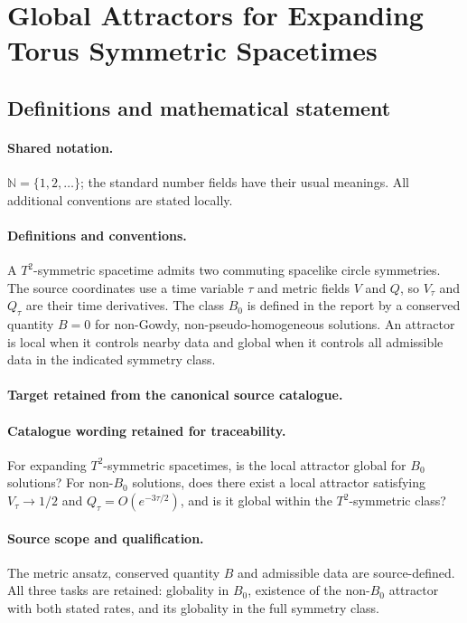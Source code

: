 \documentclass[11pt]{article}
\begin{document}
\section{Global Attractors for Expanding Torus Symmetric Spacetimes}\label{statement}

\subsection{Definitions and mathematical statement}

\paragraph{Shared notation.}$\mathbb N=\{1,2,\ldots\}$; the standard number fields have their usual meanings. All additional conventions are stated locally.


\paragraph{Definitions and conventions.}
A $T^2$-symmetric spacetime admits two commuting spacelike circle symmetries. The source coordinates use a time variable $\tau$ and metric fields $V$ and $Q$, so $V_\tau$ and $Q_\tau$ are their time derivatives. The class $B_0$ is defined in the report by a conserved quantity $B=0$ for non-Gowdy, non-pseudo-homogeneous solutions. An attractor is local when it controls nearby data and global when it controls all admissible data in the indicated symmetry class.

\paragraph{Target retained from the canonical source catalogue.}
\paragraph{Catalogue wording retained for traceability.}
For expanding $T^2$-symmetric spacetimes, is the local attractor global for $B_0$ solutions? For non-$B_0$ solutions, does there exist a local attractor satisfying $V_\tau\to1/2$ and $Q_\tau=O(e^{-3\tau/2})$, and is it global within the $T^2$-symmetric class?

\paragraph{Source scope and qualification.}
The metric ansatz, conserved quantity $B$ and admissible data are source-defined. All three tasks are retained: globality in $B_0$, existence of the non-$B_0$ attractor with both stated rates, and its globality in the full symmetry class.
\end{document}
